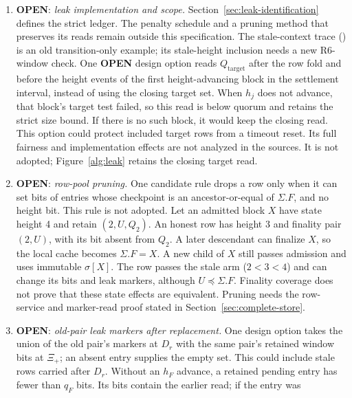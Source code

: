 \documentclass{article}
\theoremstyle{plain}
\theoremstyle{definition}
\theoremstyle{remark}
\newcommand{\Qtarget}{Q_{\mathrm{target}}}
\newcommand{\OPEN}{\textbf{OPEN}}
\begin{document}
\begin{enumerate}[leftmargin=*]
  The local deadline $q_{s^*}+\Gamma+5\Delta$ is attained at $k=13$
  in N.1.  Tightness for small~$L$ and other timeout delays remains
  open~\cite[N.1, \S11]{BPH}.  The uniform limitations in
  Section~\ref{sec:status} include both $R=2$ and $R=3$.
\item \OPEN: \emph{leak implementation and scope.}
  Section~\ref{sec:leak-identification} defines the strict ledger.
  The penalty schedule and a pruning method that preserves its reads
  remain outside this specification.  The stale-context trace
  (\cite[\S6, M2]{LS183}) is an old transition-only example; its
  stale-height inclusion needs a new R6-window check.
  One \OPEN{} design option reads $\Qtarget$ after the row fold and
  before the height events of the first height-advancing block in the
  settlement interval, instead of using the closing target set.  When
  $h_j$ does not advance, that block's target test failed, so this read
  is below quorum and retains the strict size bound.  If there is no
  such block, it would keep the closing read.  This option could protect
  included target rows from a timeout reset.  Its full fairness and
  implementation effects are not analyzed in the sources.  It is not
  adopted; Figure~\ref{alg:leak} retains the closing target read.
\item \OPEN: \emph{row-pool pruning.}
  One candidate rule drops a row only when it can set bits of entries
  whose checkpoint is an ancestor-or-equal of $\Sigma.F$, and no height bit.
  This rule is not adopted.  Let an admitted block $X$ have state height 4
  and retain $(2,U,Q_2)$.  An honest row has height 3 and finality pair
  $(2,U)$, with its bit absent from $Q_2$.  A later descendant can finalize
  $X$, so the local cache becomes $\Sigma.F=X$.  A new child of $X$ still
  passes admission and uses immutable $\sigma[X]$.  The row passes the
  stale arm ($2<3<4$) and can change its bits and leak markers, although
  $U\preceq\Sigma.F$.  Finality coverage does not prove that these state
  effects are equivalent.  Pruning needs the row-service and marker-read
  proof stated in Section~\ref{sec:complete-store}.
\item \OPEN: \emph{old-pair leak markers after replacement.}
  One design option takes the union of the old pair's markers at $D_r$
  with the same pair's retained window bits at $\Xi_+$; an absent entry
  supplies the empty set.  This could include stale rows carried after
  $D_r$.  Without an $h_F$ advance, a retained pending entry has fewer
  than $q_F$ bits.  Its bits contain the earlier read; if the entry was

\end{enumerate}
\end{document}
